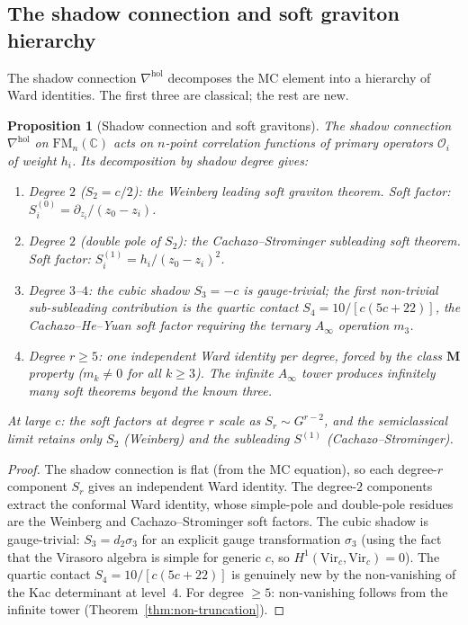 \documentclass[11pt,reqno]{amsart}
\newtheorem{proposition}[theorem]{Proposition}
\theoremstyle{definition}
\theoremstyle{remark}
\begin{document}
\subsection{The shadow connection and soft graviton hierarchy}

The shadow connection $\nabla^{\mathrm{hol}}$ decomposes the MC
element into a hierarchy of Ward identities. The first three are
classical; the rest are new.

\begin{proposition}[Shadow connection and soft gravitons]
\label{prop:soft-graviton-hierarchy}
The shadow connection $\nabla^{\mathrm{hol}}$ on
$\mathrm{FM}_n(\mathbb{C})$ acts on $n$-point correlation
functions of primary operators $\mathcal{O}_i$ of weight $h_i$.
Its decomposition by shadow degree gives:
\begin{enumerate}[label=\textup{(\roman*)}]
\item Degree $2$ ($S_2 = c/2$): the Weinberg leading soft
  graviton theorem. Soft factor:
  $S^{(0)}_i = \partial_{z_i}/(z_0 - z_i)$.
\item Degree $2$ (double pole of $S_2$): the Cachazo--Strominger
  subleading soft theorem. Soft factor:
  $S^{(1)}_i = h_i/(z_0 - z_i)^2$.
\item Degree $3$--$4$: the cubic shadow $S_3 = -c$ is
  gauge-trivial; the first non-trivial sub-subleading contribution
  is the quartic contact $S_4 = 10/[c(5c+22)]$, the
  Cachazo--He--Yuan soft factor requiring the ternary
  $A_\infty$ operation $m_3$.
\item Degree $r \ge 5$: one independent Ward identity per
  degree, forced by the class $\mathbf{M}$ property ($m_k \ne 0$
  for all $k \ge 3$). The infinite $A_\infty$ tower produces
  infinitely many soft theorems beyond the known three.
\end{enumerate}
At large $c$: the soft factors at degree $r$ scale as
$S_r \sim G^{r-2}$, and the semiclassical limit retains only
$S_2$ (Weinberg) and the subleading $S^{(1)}$ (Cachazo--Strominger).
\end{proposition}

\begin{proof}
The shadow connection is flat (from the MC equation), so each
degree-$r$ component $S_r$ gives an independent Ward identity.
The degree-$2$ components extract the conformal Ward identity,
whose simple-pole and double-pole residues are the Weinberg and
Cachazo--Strominger soft factors. The cubic shadow is
gauge-trivial: $S_3 = d_2\sigma_3$ for an explicit gauge
transformation $\sigma_3$ (using the fact that the Virasoro algebra
is simple for generic $c$, so $H^1(\mathrm{Vir}_c,\mathrm{Vir}_c)
= 0$). The quartic contact $S_4 = 10/[c(5c+22)]$ is genuinely new
by the non-vanishing of the Kac determinant at level~$4$.
For degree $\ge 5$: non-vanishing follows from the infinite tower
(Theorem~\ref{thm:non-truncation}).
\end{proof}
\end{document}
